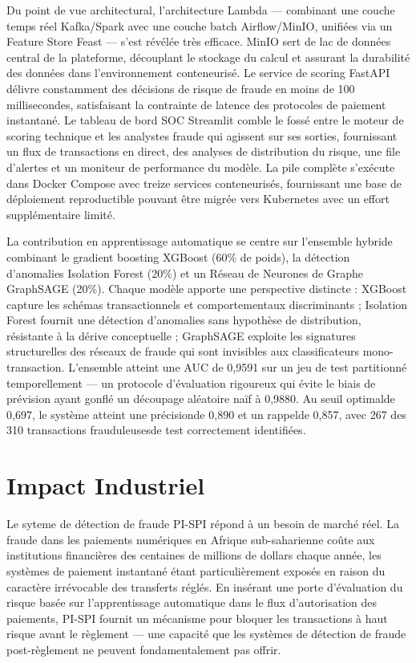\documentclass[12pt,a4paper,oneside]{book}
\theoremstyle{definition}
\theoremstyle{plain}
\begin{document}
Du point de vue architectural, l'architecture Lambda — combinant une couche temps réel Kafka/Spark avec une couche batch Airflow/MinIO, unifiées via un Feature Store Feast — s'est révélée très efficace. MinIO sert de lac de données central de la plateforme, découplant le stockage du calcul et assurant la durabilité des données dans l'environnement conteneurisé. Le service de scoring FastAPI délivre constamment des décisions de risque de fraude en moins de 100 millisecondes, satisfaisant la contrainte de latence des protocoles de paiement instantané. Le tableau de bord SOC Streamlit comble le fossé entre le moteur de scoring technique et les analystes fraude qui agissent sur ses sorties, fournissant un flux de transactions en direct, des analyses de distribution du risque, une file d'alertes et un moniteur de performance du modèle. La pile complète s'exécute dans Docker Compose avec treize services conteneurisés, fournissant une base de déploiement reproductible pouvant être migrée vers Kubernetes avec un effort supplémentaire limité.

La contribution en apprentissage automatique se centre sur l'ensemble hybride combinant le gradient boosting XGBoost (60\% de poids), la détection d'anomalies Isolation Forest (20\%) et un Réseau de Neurones de Graphe GraphSAGE (20\%). Chaque modèle apporte une perspective distincte : XGBoost capture les schémas transactionnels et comportementaux discriminants ; Isolation Forest fournit une détection d'anomalies sans hypothèse de distribution, résistante à la dérive conceptuelle ; GraphSAGE exploite les signatures structurelles des réseaux de fraude qui sont invisibles aux classificateurs mono-transaction. L'ensemble atteint une AUC de 0,9591 sur un jeu de test partitionné temporellement — un protocole d'évaluation rigoureux qui évite le biais de prévision ayant gonflé un découpage aléatoire naïf à 0,9880. Au seuil optimalde 0,697, le système atteint une précisionde 0,890 et un rappelde 0,857, avec 267 des 310 transactions frauduleusesde test correctement identifiées.

\section{Impact Industriel}

Le syteme de détection de fraude PI-SPI répond à un besoin de marché réel. La fraude dans les paiements numériques en Afrique sub-saharienne coûte aux institutions financières des centaines de millions de dollars chaque année, les systèmes de paiement instantané étant particulièrement exposés en raison du caractère irrévocable des transferts réglés. En insérant une porte d'évaluation du risque basée sur l'apprentissage automatique dans le flux d'autorisation des paiements, PI-SPI fournit un mécanisme pour bloquer les transactions à haut risque avant le règlement — une capacité que les systèmes de détection de fraude post-règlement ne peuvent fondamentalement pas offrir.
\end{document}
